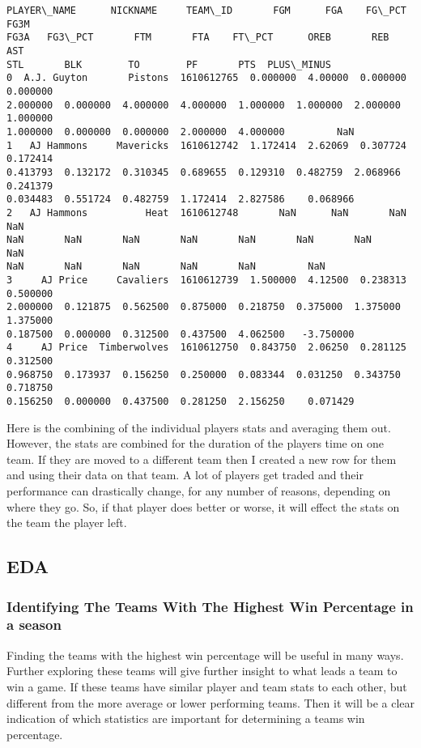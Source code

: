 \documentclass[11pt]{article}
\begin{document}
    \begin{Verbatim}[commandchars=\\\{\}]
   PLAYER\_NAME      NICKNAME     TEAM\_ID       FGM      FGA    FG\_PCT      FG3M
FG3A   FG3\_PCT       FTM       FTA    FT\_PCT      OREB       REB       AST
STL       BLK        TO        PF       PTS  PLUS\_MINUS
0  A.J. Guyton       Pistons  1610612765  0.000000  4.00000  0.000000  0.000000
2.000000  0.000000  4.000000  4.000000  1.000000  1.000000  2.000000  1.000000
1.000000  0.000000  0.000000  2.000000  4.000000         NaN
1   AJ Hammons     Mavericks  1610612742  1.172414  2.62069  0.307724  0.172414
0.413793  0.132172  0.310345  0.689655  0.129310  0.482759  2.068966  0.241379
0.034483  0.551724  0.482759  1.172414  2.827586    0.068966
2   AJ Hammons          Heat  1610612748       NaN      NaN       NaN       NaN
NaN       NaN       NaN       NaN       NaN       NaN       NaN       NaN
NaN       NaN       NaN       NaN       NaN         NaN
3     AJ Price     Cavaliers  1610612739  1.500000  4.12500  0.238313  0.500000
2.000000  0.121875  0.562500  0.875000  0.218750  0.375000  1.375000  1.375000
0.187500  0.000000  0.312500  0.437500  4.062500   -3.750000
4     AJ Price  Timberwolves  1610612750  0.843750  2.06250  0.281125  0.312500
0.968750  0.173937  0.156250  0.250000  0.083344  0.031250  0.343750  0.718750
0.156250  0.000000  0.437500  0.281250  2.156250    0.071429
    \end{Verbatim}

Here is the combining of the individual players stats and averaging them out. However, the stats are combined for the duration of the players time on one team. If they are moved to a different team then I created a new row for them and using their data on that team. A lot of players get traded and their performance can drastically change, for any number of reasons, depending on where they go. So, if that player does better or worse, it will effect the stats on the team the player left.

\subsection{EDA}

    \subsubsection{Identifying The Teams With The Highest Win Percentage in a season}
 

Finding the teams with the highest win percentage will be useful in many ways. Further exploring these teams will give further insight to what leads a team to win a game. If these teams have similar player and team stats to each other, but different from the more average or lower performing teams. Then it will be a clear indication of which statistics are important for determining a teams win percentage.
 
\end{document}
